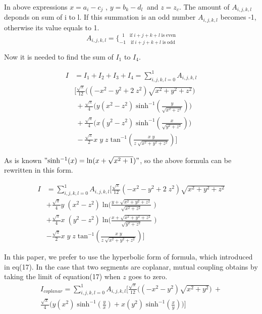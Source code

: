 \documentclass[final,5p,times,twocolumn]{elsarticle}
\begin{document}
In above expressions $x = a_i - c_j$ , $y = b_k - d_l\ $ and $z = z_c$. The amount of $A_{i,j,k,l}$ deponds on sum of i to l. If this summation is an odd number $A_{i,j,k,l}$ becomes -1, otherwise its value equals to 1.
\begin{equation}\label{eq16}
A_{i,j,k,l} = \Big\{^{\;\;1\quad  \mathrm{if}\; i + j + k + l\; \mathrm{is \;even}}_{-1\quad  \mathrm{if}\; i + j + k + l\; \mathrm{is \;odd}}
\end{equation}

Now it is needed to find the sum of $I_1$ to $I_4$.

\begin{equation}\label {eq:17}
\begin{split}
I&=I_1+I_2+I_3+I_4 = \sum_{i,j,k,l=0}^1 A_{i,j,k,l}\\
&  \bigg[ \frac {\sqrt{\pi} } {12} \Big((-x^2-y^2+2\;z^2)\sqrt{x^2 + y^2 + z^2} \Big) \\
& \ +  \frac {\sqrt{\pi} } {4} \Big( y(x^2 - z^2)\;\mathrm{sinh^{-1}}(\frac{y}{\sqrt{x^2 + z^2}}) \Big)\\
&\ +   \frac {\sqrt{\pi} } {4}\Big( x(y^2-z^2)\;\mathrm{sinh^{-1}}(\frac{x}{\sqrt{y^2 + z^2}})  \Big)\\ 
&\ -  \frac {\sqrt{\pi} } {2}x \;y\;z\;\mathrm{tan^{-1}}(\frac{x\;y}{z\;\sqrt{x^2+y^2 + z^2}})\bigg]
\end{split}
\end{equation}

As is known $"\mathrm{sinh^{-1}}(x) = \mathrm{ln}(x+\sqrt{x^2 + 1})"$,
so the above formula can be rewritten in this form.

\begin{equation}\label {eq:18}
\begin{split}
I&=\sum_{i,j,k,l=0}^1 A_{i,j,k,l}\bigg[\frac {\sqrt{\pi} } {12} (-x^2-y^2+2\;z^2)\sqrt{x^2 + y^2 + z^2}   \\
& + \frac {\sqrt{\pi} } {4}  y\;(x^2 - z^2)\;\mathrm{ln}\Big(\frac{y+\sqrt{ {x^2 + y^2 + z^2}}}{\sqrt{x^2 + z^2}}\;\Big) \\
& + \frac {\sqrt{\pi} } {4} x\;(y^2-z^2)\; \mathrm{ln}\Big(\frac{x+\sqrt{ {x^2 + y^2 + z^2}}}{\sqrt{y^2 + z^2}}\;  \Big)\\ 
&- \frac {\sqrt{\pi} } {2}x \;y\;z\;\mathrm{tan^{-1}}(\frac{x\;y}{z\;\sqrt{x^2+y^2 + z^2}} ) \bigg]
\end{split}
\end{equation}

In this paper, we prefer to use the hyperbolic form of formula, which introduced in eq(17).
In the case that two segments are coplanar, mutual coupling obtains by taking the limit of equation(17) when $z$ goes to zero.
\begin{equation}\label {eq:19}
\begin{split}
I_{coplanar}=\sum_{i,j,k,l=0}^1  A_{i,j,k,l} \bigg[  \frac {\sqrt{\pi} } {12} \Big((-x^2-y^2)\sqrt{x^2 + y^2} \Big)\ + \\
 \frac {\sqrt{\pi} } {4} \Big( y(x^2 )\;\mathrm{sinh^{-1}}(\frac{y}{x })+x(y^2)\;\mathrm{sinh^{-1}}(\frac{x}{y}) \Big) \bigg]
\end{split}
\end{equation}
\end{document}
